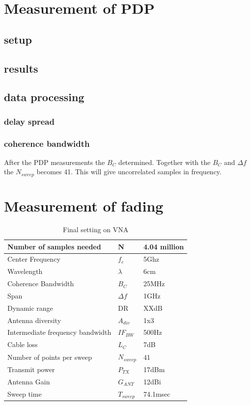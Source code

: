 \chapter{Measurement of PDP}
\section{setup}
\section{results}
\section{data processing}
\subsection{delay spread}
\subsection{coherence bandwidth}
After the PDP measurements the $B_C$ determined. Together with the $B_C$ and $\Delta f$ the $N_{sweep}$ becomes 41. This will give uncorrelated samples in frequency.

\chapter{Measurement of fading}
\begin{table}[H]
\centering
\caption{Final setting on VNA}
\label{final_specs}
\begin{tabular}{|l|l|l|}
\hline
Number of samples needed         & N           & 4.04 million         \\ \hline
Center Frequency                 & $f_c$       & 5Ghz             \\ \hline
Wavelength                       & $\lambda$   & 6cm           \\ \hline
Coherence Bandwidth                   & $B_C$  & 25MHz           \\ \hline
Span & $\Delta f$ & 1GHz \\ \hline
Dynamic range                    & DR          & XXdB            \\ \hline
Antenna diversity                & $A_{div}$   & 1x3                    \\ \hline
Intermediate frequency bandwidth & $IF_{BW}$     & 500Hz          \\ \hline
Cable loss & $L_{C}$     & 7dB          \\ \hline
Number of points per sweep & $N_{sweep}$ & 41 \\ \hline
Transmit power & $P_{TX}$ & 17dBm \\ \hline
Antenna Gain & $G_{ANT}$ & 12dBi \\ \hline
Sweep time & $T_{sweep}$ &74.1msec \\ \hline
\end{tabular}
\end{table}
   

